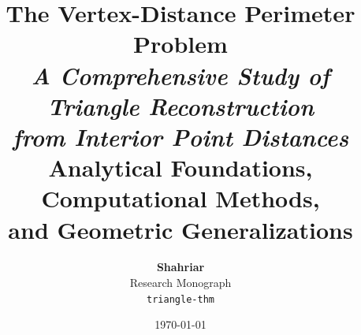 \documentclass[12pt, a4paper]{report}
\title{
    \vspace{-2cm}
    {\Huge\bfseries The Vertex-Distance Perimeter Problem}\\[0.8cm]
    {\Large\itshape A Comprehensive Study of Triangle Reconstruction\\
    from Interior Point Distances}\\[1.5cm]
    {\large Analytical Foundations, Computational Methods,\\
    and Geometric Generalizations}
}
\author{
    \textbf{Shahriar}\\[0.3cm]
    \small Research Monograph\\
    \small \texttt{triangle-thm}
}
\date{\today}
\theoremstyle{plain}
\theoremstyle{definition}
\theoremstyle{remark}
\begin{document}
\maketitle
\thispagestyle{empty}

\begin{abstract}

\end{abstract}

\tableofcontents
\listoffigures
\listoftables
























\end{document}
